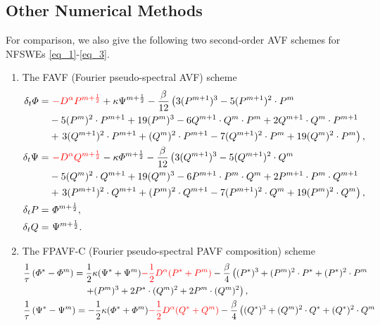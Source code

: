 \documentclass[preprint,compress,3p,10pt,fleqn]{elsarticle}
\numberwithin{equation}{section}
\begin{document}
\subsection{Other Numerical Methods}
For comparison,  we also give the following two second-order AVF schemes for NFSWEs \eqref{eq_1}-\eqref{eq_3}.
\begin{enumerate}[$\bullet$]
\item The FAVF (Fourier pseudo-spectral AVF) scheme
\begin{align}
\delta_{t} \varPhi =&~\textcolor[rgb]{1.00,0.00,0.00}{-D^{\alpha} P^{m+\frac{1}{2}}}+\kappa \Psi^{m+\frac{1}{2}}-\frac{\beta}{12}\left(3 (P^{m+1})^3-5 (P^{m+1})^2\cdot P^{m}\right.\nonumber\\
		&-5 (P^{m})^2\cdot P^{m+1}+19 (P^{m})^3-6 Q^{m+1}\cdot Q^{m}\cdot P^{m}+2 Q^{m+1}\cdot Q^{m}\cdot P^{m+1} \nonumber\\
		&+\left. 3 (Q^{m+1})^2\cdot P^{m+1}+(Q^{m})^2\cdot P^{m+1}-7 (Q^{m+1})^2\cdot P^{m}+19 (Q^{m} )^2\cdot P^{m}\right),\label{eq_66}\\
\delta_{t} \Psi =&~\textcolor[rgb]{1.00,0.00,0.00}{-D^{\alpha} Q^{m+\frac{1}{2}}}-\kappa \varPhi^{m+\frac{1}{2}}-\frac{\beta}{12}\left(3 (Q^{m+1})^3-5 (Q^{m+1})^2\cdot Q^{m}\right.\nonumber\\
		&-5 (Q^{m})^2\cdot Q^{m+1}+19 (Q^{m})^3-6 P^{m+1}\cdot P^{m}\cdot Q^{m}+2 P^{m+1}\cdot P^{m}\cdot Q^{m+1} \nonumber\\
		&+\left. 3 (P^{m+1})^2\cdot Q^{m+1}+(P^{m})^2\cdot Q^{m+1}-7 (P^{m+1})^2\cdot Q^{m}+19 (P^{m} )^2\cdot Q^{m}\right),\label{eq_67}\\
\delta_{t} P=&~\varPhi^{m+\frac{1}{2}},\label{eq_68}\\
\delta_{t} Q=&~\Psi^{m+\frac{1}{2}}.\label{eq_69}
\end{align}
\item The FPAVF-C (Fourier pseudo-spectral PAVF composition) scheme
\begin{align}
&\frac{1}{\tau}\left(\varPhi^{*}-\varPhi^{m}\right)=\frac{1}{2}\kappa(\Psi^{*}+\Psi^{m})\textcolor[rgb]{1.00,0.00,0.00}{-\frac{1}{2}D^{\alpha} (P^{*}+P^{m})}-\frac{\beta}{4}\left( (P^{*})^3+ (P^{m})^{2}\cdot P^{*}+(P^{*})^{2}\cdot P^{m}\right.\nonumber\\
		&~~~~~~~~~~~~~~~~~~~~\left.+ (P^{m})^{3}+2 P^{*}\cdot (Q^{m})^{2}+2 P^{m}\cdot (Q^{m})^{2}\right),\label{eq_90}\\
&\frac{1}{\tau}\left(\Psi^{*}-\Psi^{m}\right)=-\frac{1}{2}\kappa (\varPhi^{*}+\varPhi^{m})\textcolor[rgb]{1.00,0.00,0.00}{-\frac{1}{2}D^{\alpha} (Q^{*}+Q^{m})}-\frac{\beta}{4}\left( (Q^{*})^3+ (Q^{m})^{2}\cdot Q^{*}+ (Q^{*})^{2}\cdot Q^{m}\right.\nonumber\\

\end{align}
\end{enumerate}
\end{document}
